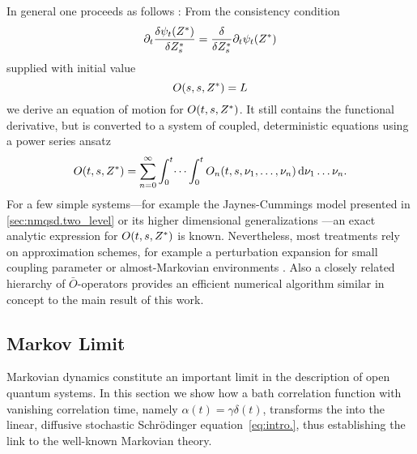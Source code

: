 In general one proceeds as follows \cite{DiGiSt98_nmqsd}:
From the consistency condition
\begin{equation}
  \partial_t \frac{\delta \psi_t({Z}^*)}{\delta {Z}^*_s} = \frac{\delta}{\delta {Z}^*_s} \partial_t \psi_t({Z}^*)
  \label{eq:nmqsd.consistency_condition}
\end{equation}
supplied with initial value
\begin{equation}
  O(s, s, {Z}^*) = L
  \label{eq:nmqsd.o_initial}
\end{equation}
we derive an equation of motion for $O(t, s, {Z}^*)$.
It still contains the functional derivative, but is converted to a system of coupled, deterministic equations using a power series ansatz
\begin{equation}
  O(t, s, {Z}^*) = \sum_{n=0}^\infty \int_0^t \dots \int_0^t O_n(t, s, \nu_1, \dots, \nu_n) \, \mathrm{d} \nu_1 \dots \nu_n.
  \label{eq:nmqsd.o_series}
\end{equation}
For a few simple systems---for example the Jaynes-Cummings model presented in \autoref{sec:nmqsd.two_level} or its higher dimensional generalizations \cite{JiZhYo12_exact_nmqsd}---an exact analytic expression for $O(t, s, {Z}^*)$ is known.
Nevertheless, most treatments rely on approximation schemes, for example a perturbation expansion for small coupling parameter or almost-Markovian environments \cite{YuDiGiSt99_pertubation}.
Also a closely related hierarchy of $\bar O$-operators provides an efficient numerical algorithm similar in concept to the main result of this work.


\subsection{Markov Limit}
\label{sub:nmqsd.markov}
%

Markovian dynamics constitute an important limit in the description of open quantum systems.
In this section we show how a bath correlation function with vanishing correlation time, namely $\alpha(t) = \gamma\delta(t)$, transforms the \NMSSE into the linear, diffusive stochastic Schrödinger equation~\ref{eq:intro.}, thus establishing the link to the well-known Markovian theory.

